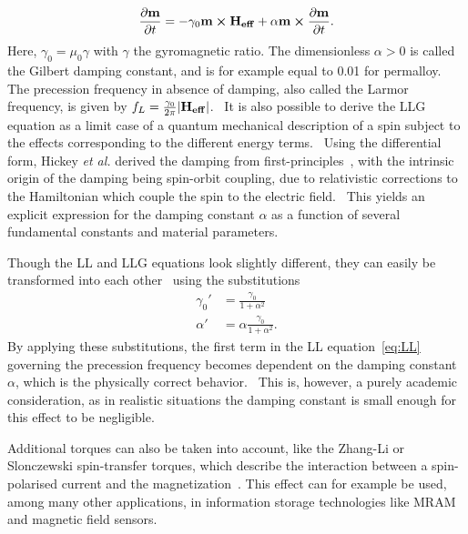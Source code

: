 \documentclass[11pt,a4paper,english]{article}
\begin{document}
\begin{equation}
    \frac{\partial \vb{m}}{\partial t} = - \gamma_0 \vb{m} \cross \vb{H_{eff}} + \alpha \vb{m} \cross \frac{\partial \vb{m}}{\partial t} \mathrm{.}
    \label{eq:LLG}
\end{equation}
Here, $\gamma_0=\mu_0 \gamma$ with $\gamma$ the gyromagnetic ratio. The dimensionless $\alpha > 0$ is called the Gilbert damping constant, and is for example equal to 0.01 for permalloy. The precession frequency in absence of damping, also called the Larmor frequency, is given by  $f_L=\frac{\gamma_0}{2\pi}\abs{\vb{H_{eff}}}$.~\cite{phd_leliaert} 
It is also possible to derive the LLG equation as a limit case of a quantum mechanical description of a spin subject to the effects corresponding to the different energy terms.~\cite{abert2013discrete,bode2012current}
Using the differential form, Hickey \textit{et al.} derived the damping from first-principles~\cite{hickey2009origin}, with the intrinsic origin of the damping being spin-orbit coupling, due to relativistic corrections to the Hamiltonian which couple the spin to the electric field.~\cite{hickey2009origin} This yields an explicit expression for the damping constant $\alpha$ as a function of several fundamental constants and material parameters. \par
Though the LL and LLG equations look slightly different, they can easily be transformed into each other~\cite{ThermFluc_SingleDomain,phd_leliaert} using the substitutions
\begin{align*}
    \gamma_0' &= \frac{\gamma_0}{1+\alpha^2} \\
    \alpha' &= \alpha \frac{\gamma_0}{1+\alpha^2} \mathrm{.}
\end{align*}
By applying these substitutions, the first term in the LL equation~\eqref{eq:LL} governing the precession frequency becomes dependent on the damping constant $\alpha$, which is the physically correct behavior.~\cite{phd_leliaert} This is, however, a purely academic consideration, as in realistic situations the damping constant is small enough for this effect to be negligible. \par
Additional torques can also be taken into account, like the Zhang-Li or Slonczewski spin-transfer torques, which describe the interaction between a spin-polarised current and the magnetization~\cite{ZhangLiSpinTransferTorque, MuMax3, syllabus_PoAEaPD}. This effect can for example be used, among many other applications, in information storage technologies like MRAM and magnetic field sensors.~\cite{syllabus_PoAEaPD}
\end{document}
